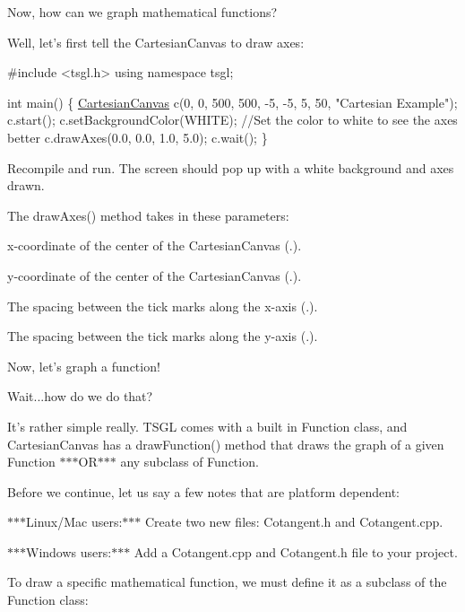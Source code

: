 Now, how can we graph mathematical functions?

Well, let's first tell the Cartesian\-Canvas to draw axes\-:


\begin{DoxyCode}
\textcolor{preprocessor}{#include <tsgl.h>}
\textcolor{keyword}{using namespace }tsgl;

\textcolor{keywordtype}{int} main() \{
  \hyperlink{classtsgl_1_1_cartesian_canvas}{CartesianCanvas} c(0, 0, 500, 500, -5, -5, 5, 50, \textcolor{stringliteral}{"Cartesian Example"});
  c.start();
  c.setBackgroundColor(WHITE);  \textcolor{comment}{//Set the color to white to see the axes better}
  c.drawAxes(0.0, 0.0, 1.0, 5.0);
  c.wait();
\}
\end{DoxyCode}


Recompile and run. The screen should pop up with a white background and axes drawn.

The {\ttfamily draw\-Axes()} method takes in these parameters\-:
\begin{DoxyItemize}
\item x-\/coordinate of the center of the Cartesian\-Canvas ({.}).
\item y-\/coordinate of the center of the Cartesian\-Canvas ({.}).
\item The spacing between the tick marks along the x-\/axis ({.}).
\item The spacing between the tick marks along the y-\/axis ({.}).
\end{DoxyItemize}

Now, let's graph a function!

Wait...how do we do that?

It's rather simple really. T\-S\-G\-L comes with a built in {\ttfamily Function} class, and Cartesian\-Canvas has a {\ttfamily draw\-Function()} method that draws the graph of a given {\ttfamily Function} $\ast$$\ast$$\ast$\-O\-R$\ast$$\ast$$\ast$ any subclass of {\ttfamily Function}.

Before we continue, let us say a few notes that are platform dependent\-:

$\ast$$\ast$$\ast$\-Linux/\-Mac users\-:$\ast$$\ast$$\ast$ Create two new files\-: Cotangent.\-h and Cotangent.\-cpp.

$\ast$$\ast$$\ast$\-Windows users\-:$\ast$$\ast$$\ast$ Add a Cotangent.\-cpp and Cotangent.\-h file to your project.

To draw a specific mathematical function, we must define it as a subclass of the {\ttfamily Function} class\-:


